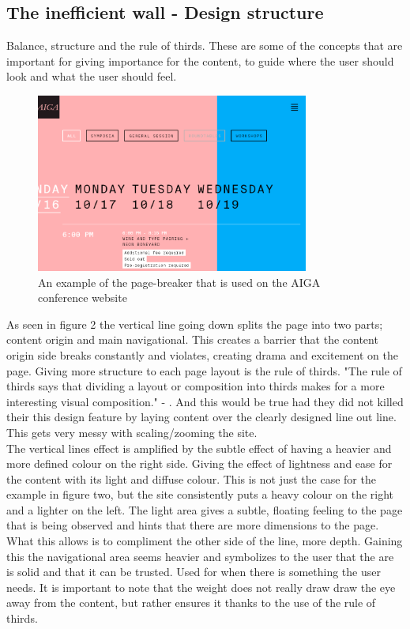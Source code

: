 \documentclass{article}
\begin{document}
        \subsection{The inefficient wall - Design structure}
        Balance, structure and the rule of thirds. These are some of the concepts that are important for giving importance for the content, to guide where the user should look and what the user should feel.
        \begin{figure}[!h]
            \centering
            \includegraphics[width=0.8\textwidth]{LineBreaker}
            \caption[width=0.8\textwidth]{An example of the page-breaker that is used on the AIGA conference website}
        \end{figure}
        As seen in figure 2 the vertical line going down splits the page into two parts; content origin and main navigational. This creates a barrier that the content origin side breaks constantly and violates, creating drama and excitement on the page. Giving more structure to each page layout is the rule of thirds. "The rule of thirds says that dividing a layout or composition into thirds makes for a more interesting visual composition." - \cite[Page. 252]{WSINYE}. And this would be true had they did not killed their this design feature by laying content over the clearly designed line out line. This gets very messy with scaling/zooming the site.\\ The vertical lines effect is amplified by the subtle effect of having a heavier and more defined colour on the right side. Giving the effect of lightness and ease for the content with its light and diffuse colour. This is not just the case for the example in figure two, but the site consistently puts a heavy colour on the right and a lighter on the left. The light area gives a subtle, floating feeling to the page that is being observed and hints that there are more dimensions to the page. What this allows is to compliment the other side of the line, more depth. Gaining this the navigational area seems heavier and symbolizes to the user that the are is solid and that it can be trusted. Used for when there is something the user needs. It is important to note that the weight does not really draw draw the eye away from the content, but rather ensures it thanks to the use of the rule of thirds.\\  
\end{document}
